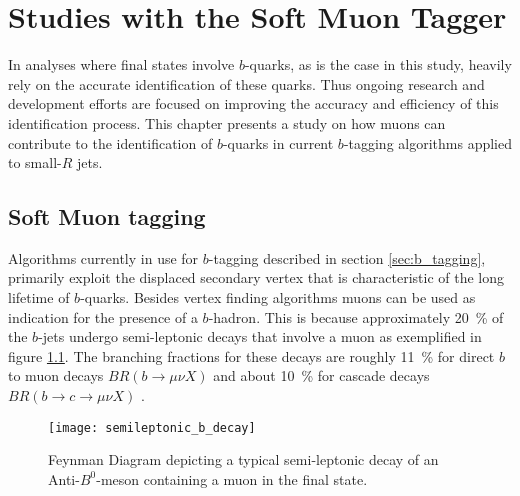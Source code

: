 \chapter{Studies with the Soft Muon Tagger}\label{ch:smt}
In analyses where final states involve  $b$-quarks, as is the case in this study, heavily rely on the accurate identification of these quarks. Thus ongoing research and development efforts are focused on improving the accuracy and efficiency of this identification process. This chapter presents a study on how muons can contribute to the identification of $b$-quarks in current $b$-tagging algorithms applied to small-$R$ jets.

\section{Soft Muon tagging}
\label{sec:SoftMuonTagging}
Algorithms currently in use for $b$-tagging described in section \ref{sec:b_tagging}, primarily exploit the displaced secondary vertex that is characteristic of the long lifetime of $b$-quarks. Besides vertex finding algorithms muons can be used as indication for the presence of a $b$-hadron. This is because approximately \qty{20}{\percent} of the $b$-jets undergo semi-leptonic decays that involve a muon as exemplified in figure \ref{fig:semileptonicDecay}. The branching fractions for these decays are roughly \qty{11}{\percent} for direct $b$ to muon decays $BR( b \rightarrow \mu \nu X )$ and about \qty{10}{\percent} for cascade decays $BR( b \rightarrow c \rightarrow \mu \nu X )$ \citep{expectedPerformanceAtlas}.
\begin{figure}[]
  \centering
  \texttt{[image: semileptonic\_b\_decay]}
  \caption{Feynman Diagram depicting a typical semi-leptonic decay of an Anti-$B^0$-meson containing a muon in the final state.}
  \label{fig:semileptonicDecay}
\end{figure}

